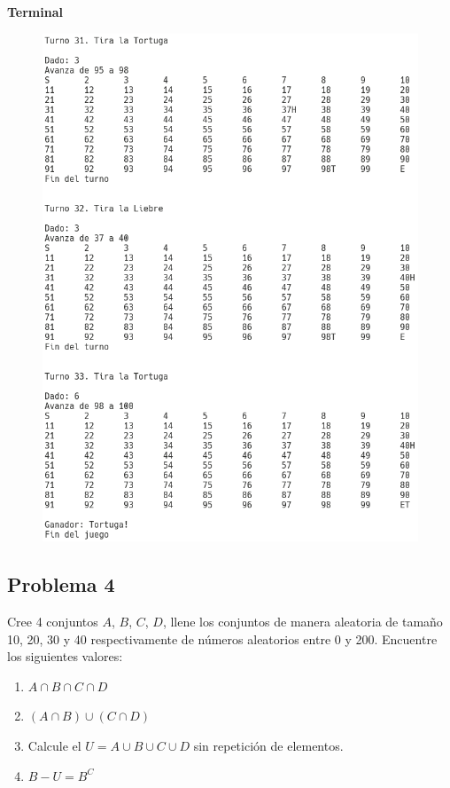 \documentclass[11pt, twocolumn]{article}
\begin{document}
  \textbf{Terminal}
  \begin{figure}[ht]
    \includegraphics[width=\columnwidth, center]{P3.png}
  \end{figure}

  \subsection*{Problema 4}
  Cree 4 conjuntos $A$, $B$, $C$, $D$, llene los conjuntos de manera aleatoria de tamaño 10, 20, 30 y 40 respectivamente de números aleatorios entre 0 y 200. Encuentre los siguientes valores:

  \begin{enumerate}[label=\alph*.]
    \item $A \cap B \cap C \cap D$
    \item $(A \cap B) \cup (C \cap D)$
    \item Calcule el $U = A \cup B \cup C \cup D$ sin repetición de elementos.
    \item $B - U = B^C$ 
  \end{enumerate}
\end{document}
